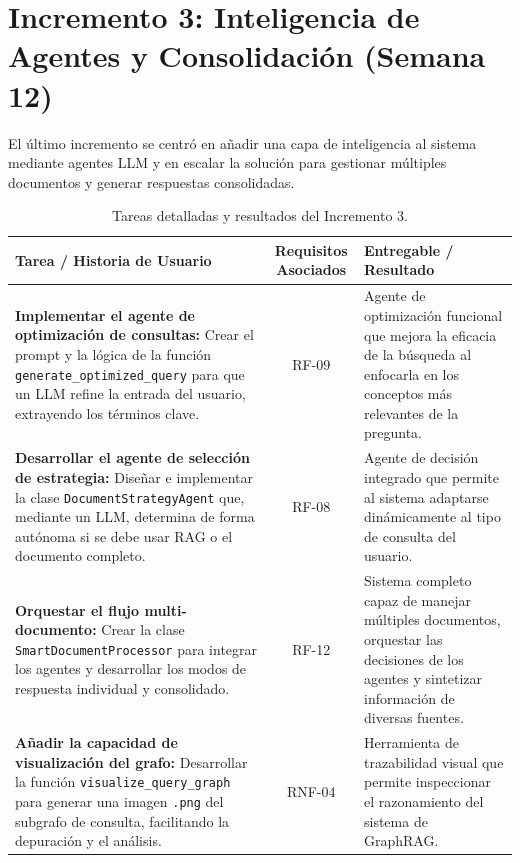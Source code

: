 \newpage
\section*{Incremento 3: Inteligencia de Agentes y Consolidación (Semana 12)}
El último incremento se centró en añadir una capa de inteligencia al sistema mediante agentes LLM y en escalar la solución para gestionar múltiples documentos y generar respuestas consolidadas.

\begin{table}[H]
    \centering
    \renewcommand{\arraystretch}{1.3}
    \caption{Tareas detalladas y resultados del Incremento 3.}
    \label{tab:incremento3_detallado}
    \begin{tabularx}{\textwidth}{|X|c|X|}
    \hline
    \textbf{Tarea / Historia de Usuario} & \textbf{Requisitos Asociados} & \textbf{Entregable / Resultado} \\
    \hline
    \textbf{Implementar el agente de optimización de consultas:} Crear el prompt y la lógica de la función \texttt{generate\_optimized\_query} para que un LLM refine la entrada del usuario, extrayendo los términos clave. & RF-09 & Agente de optimización funcional que mejora la eficacia de la búsqueda al enfocarla en los conceptos más relevantes de la pregunta. \\
    \hline
    \textbf{Desarrollar el agente de selección de estrategia:} Diseñar e implementar la clase \texttt{DocumentStrategyAgent} que, mediante un LLM, determina de forma autónoma si se debe usar RAG o el documento completo. & RF-08 & Agente de decisión integrado que permite al sistema adaptarse dinámicamente al tipo de consulta del usuario. \\
    \hline
    \textbf{Orquestar el flujo multi-documento:} Crear la clase \texttt{SmartDocumentProcessor} para integrar los agentes y desarrollar los modos de respuesta individual y consolidado. & RF-12 & Sistema completo capaz de manejar múltiples documentos, orquestar las decisiones de los agentes y sintetizar información de diversas fuentes. \\
    \hline
    \textbf{Añadir la capacidad de visualización del grafo:} Desarrollar la función \texttt{visualize\_query\_graph} para generar una imagen \texttt{.png} del subgrafo de consulta, facilitando la depuración y el análisis. & RNF-04 & Herramienta de trazabilidad visual que permite inspeccionar el razonamiento del sistema de GraphRAG. \\
    \hline
    \end{tabularx}
\end{table}

